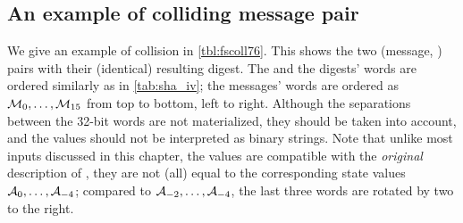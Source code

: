 \subsection{An example of colliding message pair}
\label{sec:colli_ex76}
We give an example of collision in \autoref{tbl:fscoll76}.
This shows the two (message, \iv) pairs with their (identical) resulting digest. The \ivs and the digests' words are ordered similarly
as in \autoref{tab:sha_iv}; the messages' words are ordered as $\mathcal{M}_0,\ldots,\mathcal{M}_{15}$ from top to bottom, left to right.
Although the separations between the 32-bit words are not materialized, they should be taken into account, and
the values should not be interpreted as binary strings.
Note that unlike most inputs discussed in this chapter, the \iv values are compatible with the \emph{original} description
of \shaone, \ie they are not (all) equal to the corresponding state values $\mathcal{A}_{0},\ldots,\mathcal{A}_{-4}$; compared to
$\mathcal{A}_{-2},\ldots,\mathcal{A}_{-4}$, the last three \iv words are rotated by two to the right.

